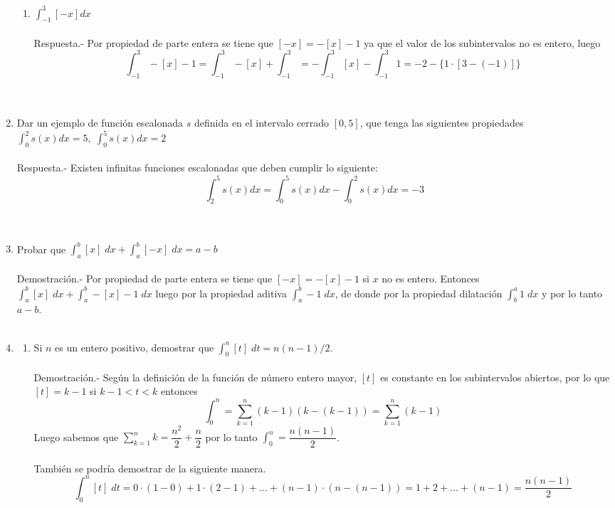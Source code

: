 \begin{enumerate}[ \bfseries 1.]
\begin{enumerate}[\bfseries (a)]
	\item $\displaystyle\int_{-1}^{3} [-x] dx$\\\\
	    Respuesta.-\; Por propiedad de parte entera se tiene que $[-x]=-[x]-1$ ya que el valor de los subintervalos no es entero, luego $$\displaystyle\int_{-1}^{3} -[x] - 1 = \int_{-1}^{3} -[x] + \int_{-1}^{3} = -\int_{-1}^{3} [x] - \int_{-1}^{3} 1 = -2 - \lbrace 1\cdot \left[3-(-1)\right]\rbrace$$\\\\

    \end{enumerate}


    \item Dar un ejemplo de función escalonada $s$ definida en el intervalo cerrado $[0,5]$, que tenga las siguientes propiedades $\displaystyle\int_{0}^{2} s(x) dx = 5,\; \int_{0}^{5}s(x) dx = 2$\\\\
	Respuesta.-\; Existen infinitas funciones escalonadas que deben cumplir lo siguiente: 
	$$\displaystyle\int_{2}^{5} s(x) dx = \int_{0}^{5} s(x) dx - \int_{0}^{2} s(x) dx=-3$$\\\\

    \item Probar que $\displaystyle\int_{a}^{b} [x] \; dx + \int_{a}^{b}[-x] \; dx = a - b$\\\\
	Demostración.-\; Por propiedad de parte entera se tiene que $[-x]=-[x]-1$ si $x$ no es entero. Entonces $\displaystyle\int_{a}^{b} [x] \; dx + \int_{a}^{b} -[x]-1 \; dx$ luego por la propiedad aditiva $\displaystyle\int_{a}^{b} -1 \; dx$, de donde por la propiedad dilatación $\displaystyle\int_{b}^{a} 1 \; dx$ y por lo tanto $a-b$.\\\\ 

    \item 
    \begin{enumerate}[\bfseries (a)]
	
	\item Si $n$ es un entero positivo, demostrar que $\displaystyle\int_{0}^{n} [t] \; dt = n(n-1)/2$.\\\\
	    Demostración.-\; Según la definición de la función de número entero mayor, $[t]$ es constante en los subintervalos abiertos, por lo que $[t]=k-1$ si $k-1<t<k$ entonces  $$\displaystyle\int_{0}^{n} = \sum_{k=1}^{n} (k-1)(k-(k-1)) = \sum_{k=1}^{n} (k-1)$$ Luego sabemos que $\sum\limits_{k=1}^{n} k = \dfrac{n^2}{2}+\dfrac{n}{2}$ por lo tanto $\displaystyle\int_{0}^{n}=\dfrac{n(n-1)}{2}$. \\\\
	    También se podría demostrar de la siguiente manera.
	    $$\displaystyle\int_{0}^{n} [t] \; dt = 0\cdot (1-0) + 1\cdot (2-1) + ... + (n-1)\cdot (n-(n-1))=1+2+...+(n-1)=\dfrac{n(n-1)}{2}$$\\\\


\end{enumerate}
\end{enumerate}
